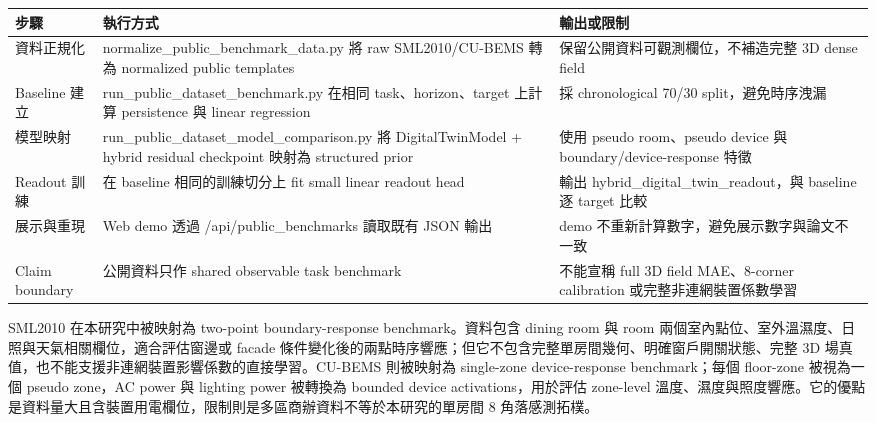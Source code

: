 \documentclass[12pt,a4paper]{article}
\begin{document}
\begin{table}[htbp]
\centering
\footnotesize
\renewcommand{\arraystretch}{1.25}
\begin{tabular}{|>{\raggedright\arraybackslash}p{}|>{\raggedright\arraybackslash}p{}|>{\raggedright\arraybackslash}p{}|}
\hline
\textbf{步驟} & \textbf{執行方式} & \textbf{輸出或限制} \\
\hline
資料正規化 & normalize\_\allowbreak{}public\_\allowbreak{}benchmark\_\allowbreak{}data.py 將 raw SML2010/CU-BEMS 轉為 normalized public templates & 保留公開資料可觀測欄位，不補造完整 3D dense field \\
\hline
Baseline 建立 & run\_\allowbreak{}public\_\allowbreak{}dataset\_\allowbreak{}benchmark.py 在相同 task、horizon、target 上計算 persistence 與 linear regression & 採 chronological 70/30 split，避免時序洩漏 \\
\hline
模型映射 & run\_\allowbreak{}public\_\allowbreak{}dataset\_\allowbreak{}model\_\allowbreak{}comparison.py 將 DigitalTwinModel + hybrid residual checkpoint 映射為 structured prior & 使用 pseudo room、pseudo device 與 boundary/device-response 特徵 \\
\hline
Readout 訓練 & 在 baseline 相同的訓練切分上 fit small linear readout head & 輸出 hybrid\_\allowbreak{}digital\_\allowbreak{}twin\_\allowbreak{}readout，與 baseline 逐 target 比較 \\
\hline
展示與重現 & Web demo 透過 /api/public\_\allowbreak{}benchmarks 讀取既有 JSON 輸出 & demo 不重新計算數字，避免展示數字與論文不一致 \\
\hline
Claim boundary & 公開資料只作 shared observable task benchmark & 不能宣稱 full 3D field MAE、8-corner calibration 或完整非連網裝置係數學習 \\
\hline
\end{tabular}
\end{table}

SML2010 在本研究中被映射為 two-point boundary-response benchmark。資料包含 dining room 與 room 兩個室內點位、室外溫濕度、日照與天氣相關欄位，適合評估窗邊或 facade 條件變化後的兩點時序響應；但它不包含完整單房間幾何、明確窗戶開關狀態、完整 3D 場真值，也不能支援非連網裝置影響係數的直接學習。CU-BEMS 則被映射為 single-zone device-response benchmark；每個 floor-zone 被視為一個 pseudo zone，AC power 與 lighting power 被轉換為 bounded device activations，用於評估 zone-level 溫度、濕度與照度響應。它的優點是資料量大且含裝置用電欄位，限制則是多區商辦資料不等於本研究的單房間 8 角落感測拓樸。
\end{document}
